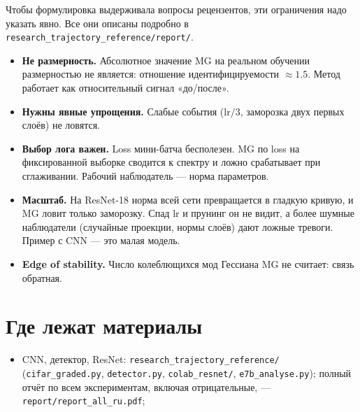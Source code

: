 \documentclass[10pt,a4paper]{article}
\begin{document}
Чтобы формулировка выдерживала вопросы рецензентов, эти ограничения надо указать
явно. Все они описаны подробно в \texttt{research\_trajectory\_reference/report/}.
\begin{itemize}\setlength\itemsep{1pt}
\item \textbf{Не размерность.} Абсолютное значение MG на реальном обучении
  размерностью не является: отношение идентифицируемости $\approx 1.5$. Метод
  работает как относительный сигнал «до/после».
\item \textbf{Нужны явные упрощения.} Слабые события (lr$/3$, заморозка двух первых
  слоёв) не ловятся.
\item \textbf{Выбор лога важен.} Loss мини-батча бесполезен. MG по loss на
  фиксированной выборке сводится к спектру и ложно срабатывает при сглаживании.
  Рабочий наблюдатель --- норма параметров.
\item \textbf{Масштаб.} На ResNet-18 норма всей сети превращается в гладкую кривую,
  и MG ловит только заморозку. Спад lr и прунинг он не видит, а более шумные
  наблюдатели (случайные проекции, нормы слоёв) дают ложные тревоги. Пример с CNN
  --- это малая модель.
\item \textbf{Edge of stability.} Число колеблющихся мод Гессиана MG не считает:
  связь обратная.
\end{itemize}

\section*{Где лежат материалы}
\small
\begin{itemize}\setlength\itemsep{0pt}
\item CNN, детектор, ResNet: \texttt{research\_trajectory\_reference/}\newline
  (\texttt{cifar\_graded.py}, \texttt{detector.py}, \texttt{colab\_resnet/},
  \texttt{e7b\_analyse.py}); полный отчёт по всем экспериментам, включая
  отрицательные, --- \texttt{report/report\_all\_ru.pdf};
\end{itemize}
\end{document}
